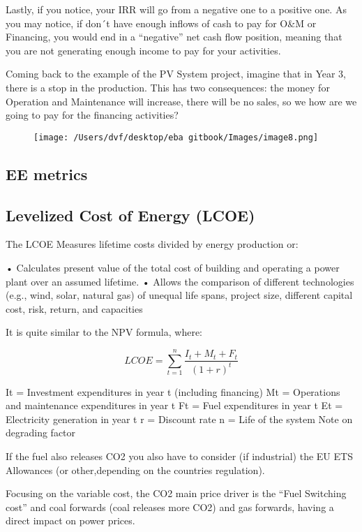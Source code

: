 \documentclass[]{book}
\theoremstyle{definition}
\theoremstyle{definition}
\theoremstyle{definition}
\theoremstyle{remark}
\begin{document}
Lastly, if you notice, your IRR will go from a negative one to a
positive one. As you may notice, if don´t have enough inflows of cash to
pay for O\&M or Financing, you would end in a ``negative'' net cash flow
position, meaning that you are not generating enough income to pay for
your activities.

Coming back to the example of the PV System project, imagine that in
Year 3, there is a stop in the production. This has two consequences:
the money for Operation and Maintenance will increase, there will be no
sales, so we how are we going to pay for the financing activities?

\begin{figure}[htbp]
\centering
\texttt{[image: /Users/dvf/desktop/eba gitbook/Images/image8.png]}
\caption{}
\end{figure}

\subsection{EE metrics}\label{ee-metrics}

\subsection{Levelized Cost of Energy
(LCOE)}\label{levelized-cost-of-energy-lcoe}

The LCOE Measures lifetime costs divided by energy production or:

• Calculates present value of the total cost of building and operating a
power plant over an assumed lifetime. • Allows the comparison of
different technologies (e.g., wind, solar, natural gas) of unequal life
spans, project size, different capital cost, risk, return, and
capacities

It is quite similar to the NPV formula, where:

\[LCOE = \sum_{t=1}^{n}\frac{I_t+M_t+F_t}{(1+r)^t}\]

It = Investment expenditures in year t (including financing) Mt =
Operations and maintenance expenditures in year t Ft = Fuel expenditures
in year t Et = Electricity generation in year t r = Discount rate n =
Life of the system Note on degrading factor

If the fuel also releases CO2 you also have to consider (if industrial)
the EU ETS Allowances (or other,depending on the countries regulation).

Focusing on the variable cost, the CO2 main price driver is the ``Fuel
Switching cost'' and coal forwards (coal releases more CO2) and gas
forwards, having a direct impact on power prices.
\end{document}
